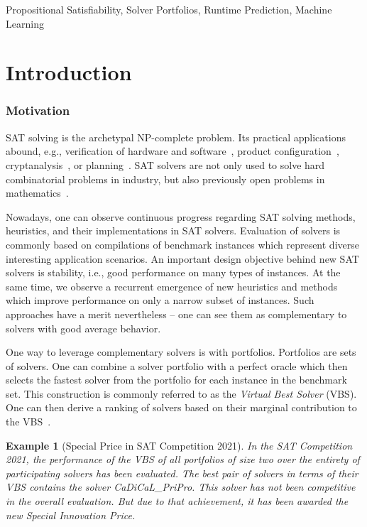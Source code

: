 \documentclass[conference]{IEEEtran}
\newtheorem{example}{Example}
\begin{document}
\begin{IEEEkeywords}
Propositional Satisfiability, Solver Portfolios, Runtime Prediction, Machine Learning
\end{IEEEkeywords}

\section{Introduction}
\label{sec:introduction}

\subsubsection{Motivation}

SAT solving is the archetypal NP-complete problem.
Its practical applications abound, e.g., verification of hardware and software~\cite{Kaufmann:2021:Amulet,Buning:2020:QPRVerify}, product configuration~\cite{Janota:2014:Configuration}, cryptanalysis~\cite{Nejati:2020:CDCLCrypto}, or planning~\cite{Schreiber:2021:Lilotane}.
SAT solvers are not only used to solve hard combinatorial problems in industry, but also previously open problems in mathematics~\cite{Heule:2016:Pyth,Heule:2018:Schur}. 

Nowadays, one can observe continuous progress regarding SAT solving methods, heuristics, and their implementations in SAT solvers. 
Evaluation of solvers is commonly based on compilations of benchmark instances which represent diverse interesting application scenarios. 
An important design objective behind new SAT solvers is stability, i.e., good performance on many types of instances. 
At the same time, we observe a recurrent emergence of new heuristics and methods which improve performance on only a narrow subset of instances. 
Such approaches have a merit nevertheless -- one can see them as complementary to solvers with good average behavior. 

One way to leverage complementary solvers is with portfolios.
Portfolios are sets of solvers.  
One can combine a solver portfolio with a perfect oracle which then selects the fastest solver from the portfolio for each instance in the benchmark set. 
This construction is commonly referred to as the \emph{Virtual Best Solver} (VBS). 
One can then derive a ranking of solvers based on their marginal contribution to the VBS~\cite{Xu:2012:EvalContribVBS}. 

\begin{example}[Special Price in SAT Competition 2021]
In the SAT Competition 2021, the performance of the VBS of all portfolios of size two over the entirety of participating solvers has been evaluated. 
The best pair of solvers in terms of their VBS contains the solver \emph{CaDiCaL\_PriPro}.
This solver has not been competitive in the overall evaluation.
But due to that achievement, it has been awarded the new \emph{Special Innovation Price}.
\end{example}
\end{document}
